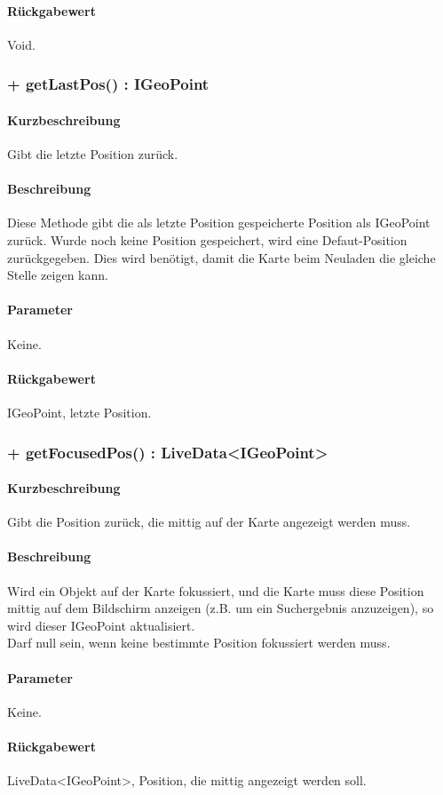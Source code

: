 \paragraph*{Rückgabewert}
Void.

\subsubsection{+ getLastPos() : IGeoPoint}%
\paragraph*{Kurzbeschreibung}
Gibt die letzte Position zurück.
\paragraph*{Beschreibung}
Diese Methode gibt die als letzte Position gespeicherte Position als IGeoPoint zurück.
Wurde noch keine Position gespeichert, wird eine Defaut-Position zurückgegeben.
Dies wird benötigt, damit die Karte beim Neuladen die gleiche Stelle zeigen kann.
\paragraph*{Parameter}
Keine.
\paragraph*{Rückgabewert}
IGeoPoint, letzte Position.

\subsubsection{+ getFocusedPos() : LiveData<IGeoPoint>}%
\paragraph*{Kurzbeschreibung}
Gibt die Position zurück, die mittig auf der Karte angezeigt werden muss.
\paragraph*{Beschreibung}
Wird ein Objekt auf der Karte fokussiert, und die Karte muss diese Position mittig auf dem 
Bildschirm anzeigen (z.B. um ein Suchergebnis anzuzeigen), so wird dieser IGeoPoint aktualisiert.\\
Darf null sein, wenn keine bestimmte Position fokussiert werden muss.
\paragraph*{Parameter}
Keine.
\paragraph*{Rückgabewert}
LiveData<IGeoPoint>, Position, die mittig angezeigt werden soll.
